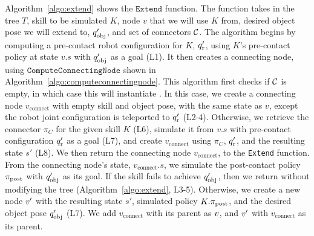 \newcommand{\connectingnode}{v_{\text{connect}}}
Algorithm~\ref{algo:extend} shows the $\texttt{Extend}$ function. The function takes in the tree $T$, skill to be simulated $K$, node $v$ that we will use $K$ from, desired object pose we will extend to, $q_\text{obj}'$, and set of connectors $\mathcal{C}$. The algorithm begins by computing a pre-contact robot configuration for $K$, $q_\text{r}'$, using $K$'s pre-contact policy at state $v.s$ with $q_\text{obj}'$ as a goal (L1). It then creates a connecting node, using $\texttt{ComputeConnectingNode}$ shown in Algorithm~\ref{algo:computeconnectingnode}. This algorithm first checks if $\mathcal{C}$ is empty, in which case this will instantiate \lazyskillrrt. In this case, we create a connecting node $\connectingnode$ with empty skill and object pose, with the same state as $v$, except the robot joint configuration is teleported to $q_\text{r}'$ (L2-4). Otherwise, we retrieve the connector $\pi_C$ for the given skill $K$ (L6), simulate it from $v.s$ with pre-contact configuration $q_\text{r}'$ as a goal (L7), and create $\connectingnode$ using $\pi_C$, $q_\text{r}'$, and the resulting state $s'$ (L8). We then return the connecting node $\connectingnode$, to the \texttt{Extend} function. From the connecting node's state, $\connectingnode.s$, we simulate the post-contact policy $\pi_{\text{post}}$  with $q_\text{obj}'$ as its goal. If the skill fails to achieve $q_\text{obj}'$, then we return without modifying the tree (Algorithm~\ref{algo:extend}, L3-5).
Otherwise, we create a new node $v'$ with the resulting state $s'$, simulated policy $K.\pi_{\text{post}}$, and the desired object pose $q_\text{obj}'$ (L7). We add $\connectingnode$ with its parent as $v$, and $v'$ with $\connectingnode$ as its parent.


